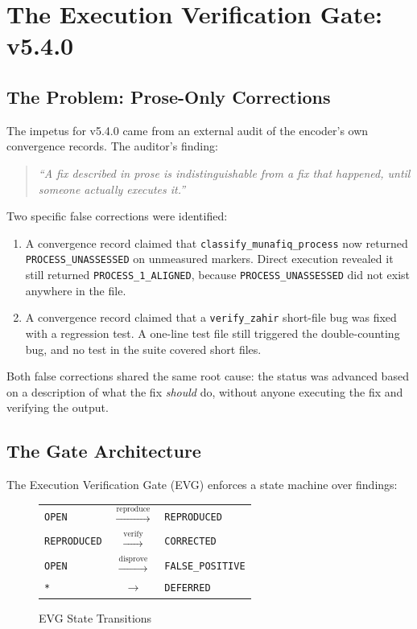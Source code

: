 \documentclass[11pt,a4paper]{article}
\begin{document}
\section{The Execution Verification Gate: v5.4.0}

\subsection{The Problem: Prose-Only Corrections}

The impetus for v5.4.0 came from an external audit of the encoder's own convergence records. The auditor's finding:

\begin{quote}
\textit{``A fix described in prose is indistinguishable from a fix that happened, until someone actually executes it.''}
\end{quote}

Two specific false corrections were identified:

\begin{enumerate}[nosep]
    \item A convergence record claimed that \texttt{classify\_munafiq\_process} now returned \texttt{PROCESS\_UNASSESSED} on unmeasured markers. Direct execution revealed it still returned \texttt{PROCESS\_1\_ALIGNED}, because \texttt{PROCESS\_UNASSESSED} did not exist anywhere in the file.
    \item A convergence record claimed that a \texttt{verify\_zahir} short-file bug was fixed with a regression test. A one-line test file still triggered the double-counting bug, and no test in the suite covered short files.
\end{enumerate}

Both false corrections shared the same root cause: the status was advanced based on a description of what the fix \textit{should} do, without anyone executing the fix and verifying the output.

\subsection{The Gate Architecture}

The Execution Verification Gate (EVG) enforces a state machine over findings:

\begin{figure}[H]
\centering
\begin{tabular}{@{}lcl@{}}
\texttt{OPEN} & $\xrightarrow{\text{reproduce}}$ & \texttt{REPRODUCED} \\
\texttt{REPRODUCED} & $\xrightarrow{\text{verify}}$ & \texttt{CORRECTED} \\
\texttt{OPEN} & $\xrightarrow{\text{disprove}}$ & \texttt{FALSE\_POSITIVE} \\
\texttt{*} & $\rightarrow$ & \texttt{DEFERRED} \\
\end{tabular}
\caption{EVG State Transitions}
\end{figure}
\end{document}
